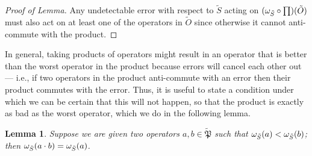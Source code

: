 \documentclass[twocolumn,showpacs,preprintnumbers,amsmath,amssymb,nofootinbib,pra,floatfix]{revtex4-1}
\newtheorem{lemma}{Lemma}
\newenvironment{remark}[1][Remark]{\begin{trivlist}
\item[\hskip \labelsep {\bfseries #1}]}{\end{trivlist}}
\newcommand{\set}{\tilde}
\newcommand{\pauligroup}{{\set{\mathfrak{P}}}}
\begin{document}
\begin{proof}[Proof of Lemma]
Any undetectable error with respect to $\set S$ acting on $(\om_{\set S}\circ \prod)(\set O)$ must also act on at least one of the operators in $\set O$ since otherwise it cannot anti-commute with the product. \end{proof}
\begin{remark}
In general, taking products of operators might result in an operator that is better than the worst operator in the product because errors will cancel each other out --- i.e., if two operators in the product anti-commute with an error then their product commutes with the error.  Thus, it is useful to state a condition under which we can be certain that this will not happen, so that the product is exactly as bad as the worst operator, which we do in the following lemma.
\end{remark}

\begin{lemma}
\label{lesser-operator-wins}
Suppose we are given two operators $a,b\in\pauligroup$ such that $\om_{\set S}(a)<\om_{\set S}(b)$;  then $\om_{\set S}(a\cdot b) = \om_{\set S}(a)$.
\end{lemma}
\end{document}
